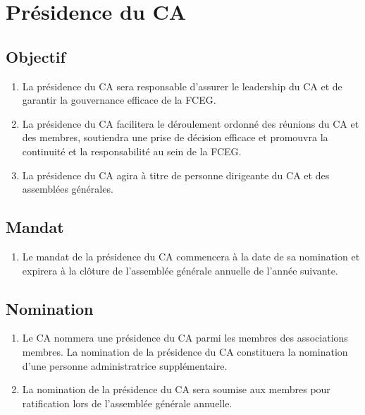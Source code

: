 \section{Présidence du CA}
\label{presidence-du-ca}

\subsection{Objectif}
\label{presidence-du-ca-objectif}

\begin{enumerate}
 \item La présidence du CA sera responsable d'assurer le leadership du CA et de garantir la gouvernance efficace de la FCEG.
 \item La présidence du CA facilitera le déroulement ordonné des réunions du CA et des membres, soutiendra une prise de décision efficace et promouvra la continuité et la responsabilité au sein de la FCEG.
 \item La présidence du CA agira à titre de personne dirigeante du CA et des assemblées générales.
\end{enumerate}

\subsection{Mandat}
\label{presidence-du-ca-mandat}

\begin{enumerate}
 \item Le mandat de la présidence du CA commencera à la date de sa nomination et expirera à la clôture de l'assemblée générale annuelle de l'année suivante.
\end{enumerate}

\subsection{Nomination}
\label{presidence-du-ca-nomination}

\begin{enumerate}
 \item Le CA nommera une présidence du CA parmi les membres des associations membres. La nomination de la présidence du CA constituera la nomination d'une personne administratrice supplémentaire.
 \item La nomination de la présidence du CA sera soumise aux membres pour ratification lors de l'assemblée générale annuelle.
\end{enumerate}
